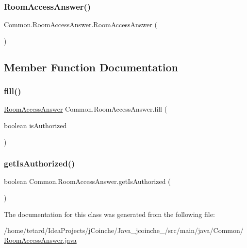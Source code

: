 \subsubsection{\texorpdfstring{Room\+Access\+Answer()}{RoomAccessAnswer()}}
{\footnotesize\ttfamily Common.\+Room\+Access\+Answer.\+Room\+Access\+Answer (\begin{DoxyParamCaption}{ }\end{DoxyParamCaption})\hspace{0.3cm}{\ttfamily [inline]}}



\subsection{Member Function Documentation}
\mbox{\label{classCommon_1_1RoomAccessAnswer_abda9141bb331155f3cec2575a1b948c3}} 
\subsubsection{\texorpdfstring{fill()}{fill()}}
{\footnotesize\ttfamily \mbox{\hyperlink{classCommon_1_1RoomAccessAnswer}{Room\+Access\+Answer}} Common.\+Room\+Access\+Answer.\+fill (\begin{DoxyParamCaption}\item[{boolean}]{is\+Authorized }\end{DoxyParamCaption})\hspace{0.3cm}{\ttfamily [inline]}}

\mbox{\label{classCommon_1_1RoomAccessAnswer_aca54d5af45356088e89548f3d7f2e137}} 
\subsubsection{\texorpdfstring{get\+Is\+Authorized()}{getIsAuthorized()}}
{\footnotesize\ttfamily boolean Common.\+Room\+Access\+Answer.\+get\+Is\+Authorized (\begin{DoxyParamCaption}{ }\end{DoxyParamCaption})\hspace{0.3cm}{\ttfamily [inline]}}



The documentation for this class was generated from the following file\+:\begin{DoxyCompactItemize}
\item 
/home/tetard/\+Idea\+Projects/j\+Coinche/\+Java\+\_\+jcoinche\+\_/src/main/java/\+Common/\mbox{\hyperlink{RoomAccessAnswer_8java}{Room\+Access\+Answer.\+java}}\end{DoxyCompactItemize}
